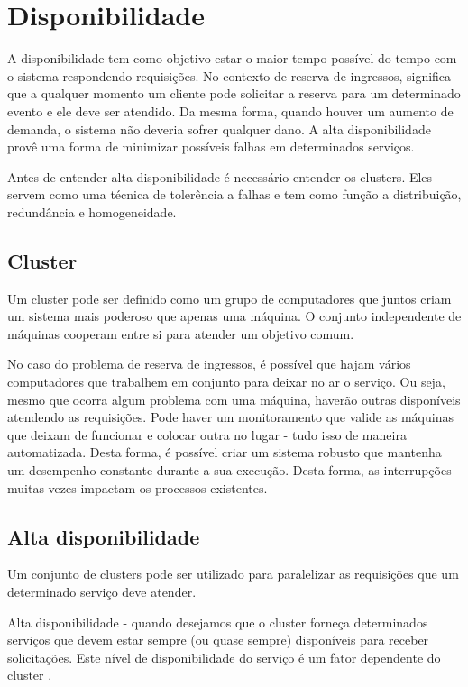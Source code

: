 \chapter{Disponibilidade}

A disponibilidade tem como objetivo estar o maior tempo possível do tempo
com o sistema respondendo requisições. No contexto de reserva de ingressos,
significa que a qualquer momento um cliente pode solicitar a reserva para
um determinado evento e ele deve ser atendido. Da mesma forma, quando houver
um aumento de demanda, o sistema não deveria sofrer qualquer dano. A alta
disponibilidade provê uma forma de minimizar possíveis falhas em determinados
serviços.

Antes de entender alta disponibilidade é necessário entender os clusters.
Eles servem como uma técnica de tolerência a falhas e tem como função a
distribuição, redundância e homogeneidade.

\section{Cluster}

Um cluster pode ser definido como um grupo de computadores que juntos
criam um sistema mais poderoso que apenas uma máquina. O conjunto
independente de máquinas cooperam entre si para atender um objetivo comum.

No caso do problema de reserva de ingressos, é possível que hajam vários
computadores que trabalhem em conjunto para deixar no ar o serviço.
Ou seja, mesmo que ocorra algum problema com uma máquina, haverão outras
disponíveis atendendo as requisições.
Pode haver um monitoramento que valide as máquinas que deixam de funcionar
e colocar outra no lugar - tudo isso de maneira automatizada.
Desta forma, é possível criar um sistema robusto que mantenha um desempenho
constante durante a sua execução.
Desta forma, as interrupções muitas vezes impactam os processos existentes.

\section{Alta disponibilidade}

Um conjunto de clusters pode ser utilizado para paralelizar as requisições
que um determinado serviço deve atender.

\begin{citacao}

Alta disponibilidade - quando desejamos que o cluster forneça determinados
serviços que devem estar sempre (ou quase sempre) disponíveis para receber
solicitações.
Este nível de disponibilidade do serviço é um fator dependente do cluster
\cite{servicos-de-pertinencia-para-clusters-de-alta-disponibilidade}.

\end{citacao}

